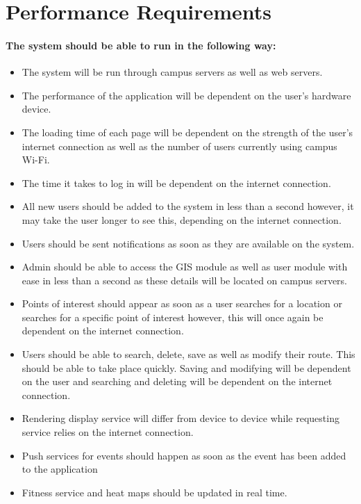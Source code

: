 \documentclass[11pt]{article}
\begin{document}
	\section{Performance Requirements}
	\paragraph{The system should be able to run in the following way: }
	\begin{itemize}
	\item The system will be run through campus servers as well as web servers.
	\item The performance of the application will be dependent on the user’s hardware device.
	\item The loading time of each page will be dependent on the strength of the user’s internet connection as well as the number of users currently using campus Wi-Fi.
	\item The time it takes to log in will be dependent on the internet connection.
	\item All new users should be added to the system in less than a second however, it may take the user longer to see this, depending on the internet connection.
	\item Users should be sent notifications as soon as they are available on the system.
	\item Admin should be able to access the GIS module as well as user module with ease in less than a second as these details will be located on campus servers.
	\item Points of interest should appear as soon as a user searches for a location or searches for a specific point of interest however, this will once again be dependent on the internet connection.
	\item Users should be able to search, delete, save as well as modify their route. This should be able to take place quickly. Saving and modifying will be dependent on the user and searching and deleting will be dependent on the internet connection.
	\item Rendering display service will differ from device to device while requesting service relies on the internet connection.
	\item Push services for events should happen as soon as the event has been added to the application
	\item Fitness service and heat maps should be updated in real time.
	\end{itemize}
	
\end{document}
